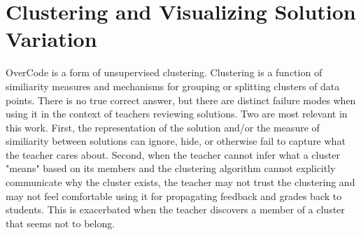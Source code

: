


\section{Clustering and Visualizing Solution Variation}

OverCode is a form of unsupervised clustering. Clustering is a function of similiarity measures and mechanisms for grouping or splitting clusters of data points. There is no true correct answer, but there are distinct failure modes when using it in the context of teachers reviewing solutions. Two are most relevant in this work. First, the representation of the solution and/or the measure of similiarity between solutions can ignore, hide, or otherwise fail to capture what the teacher cares about. Second, when the teacher cannot infer what a cluster "means" based on its members and the clustering algorithm cannot explicitly communicate why the cluster exists, the teacher may not trust the clustering and may not feel comfortable using it for propagating feedback and grades back to students. This is exacerbated when the teacher discovers a member of a cluster that seems not to belong.

